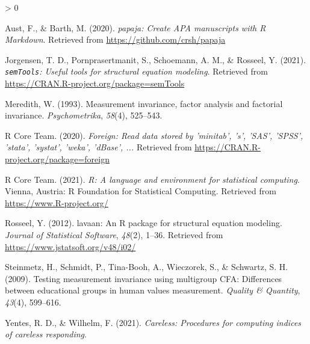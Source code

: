 \documentclass[
  english,
  man]{apa6}
\newlength{\cslhangindent}
\newenvironment{CSLReferences}[2] %
 {%
  \setlength{\parindent}{0pt}
  \ifodd #1 \everypar{\setlength{\hangindent}{\cslhangindent}}\ignorespaces\fi
  \ifnum #2 > 0
  \setlength{\parskip}{#2\baselineskip}
  \fi
 }%
 {}
\begin{document}
\begingroup
\setlength{\parindent}{-0.5in}
\setlength{\leftskip}{0.5in}

\hypertarget{refs}{}
\begin{CSLReferences}{1}{0}
\leavevmode\hypertarget{ref-R-papaja}{}%
Aust, F., \& Barth, M. (2020). \emph{{papaja}: {Create} {APA} manuscripts with {R Markdown}}. Retrieved from \url{https://github.com/crsh/papaja}

\leavevmode\hypertarget{ref-R-semTools}{}%
Jorgensen, T. D., Pornprasertmanit, S., Schoemann, A. M., \& Rosseel, Y. (2021). \emph{\texttt{semTools}: {U}seful tools for structural equation modeling}. Retrieved from \url{https://CRAN.R-project.org/package=semTools}

\leavevmode\hypertarget{ref-meredith1993measurement}{}%
Meredith, W. (1993). Measurement invariance, factor analysis and factorial invariance. \emph{Psychometrika}, \emph{58}(4), 525--543.

\leavevmode\hypertarget{ref-R-foreign}{}%
R Core Team. (2020). \emph{Foreign: Read data stored by 'minitab', 's', 'SAS', 'SPSS', 'stata', 'systat', 'weka', 'dBase', ...} Retrieved from \url{https://CRAN.R-project.org/package=foreign}

\leavevmode\hypertarget{ref-R-base}{}%
R Core Team. (2021). \emph{R: A language and environment for statistical computing}. Vienna, Austria: R Foundation for Statistical Computing. Retrieved from \url{https://www.R-project.org/}

\leavevmode\hypertarget{ref-R-lavaan}{}%
Rosseel, Y. (2012). {lavaan}: An {R} package for structural equation modeling. \emph{Journal of Statistical Software}, \emph{48}(2), 1--36. Retrieved from \url{https://www.jstatsoft.org/v48/i02/}

\leavevmode\hypertarget{ref-steinmetz2009testing}{}%
Steinmetz, H., Schmidt, P., Tina-Booh, A., Wieczorek, S., \& Schwartz, S. H. (2009). Testing measurement invariance using multigroup CFA: Differences between educational groups in human values measurement. \emph{Quality \& Quantity}, \emph{43}(4), 599--616.

\leavevmode\hypertarget{ref-R-careless}{}%
Yentes, R. D., \& Wilhelm, F. (2021). \emph{Careless: Procedures for computing indices of careless responding}.

\end{CSLReferences}

\endgroup
\end{document}
